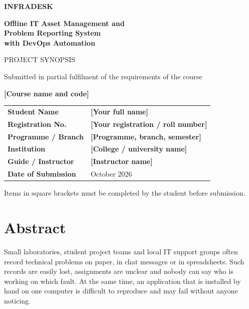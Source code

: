 \documentclass[12pt,a4paper]{article}
\newcommand{\fillin}[1]{\textbf{[#1]}}
\begin{document}
\begin{titlepage}
\centering
\vspace*{1.5cm}

{\Huge\bfseries\color{accent} INFRADESK\par}
\vspace{0.6cm}
{\Large\bfseries Offline IT Asset Management and\\ Problem Reporting System\\ with DevOps Automation\par}
\vspace{1.2cm}

{\large PROJECT SYNOPSIS\par}
\vspace{0.4cm}
{\normalsize Submitted in partial fulfilment of the requirements of the course\par}
{\normalsize \fillin{Course name and code}\par}

\vspace{2cm}

\begin{tabular}{>{\bfseries}l l}
Student Name        & \fillin{Your full name} \\[4pt]
Registration No.    & \fillin{Your registration / roll number} \\[4pt]
Programme / Branch  & \fillin{Programme, branch, semester} \\[4pt]
Institution         & \fillin{College / university name} \\[4pt]
Guide / Instructor  & \fillin{Instructor name} \\[4pt]
Date of Submission  & October 2026 \\
\end{tabular}

\vfill
{\small Items in square brackets must be completed by the student before submission.\par}
\end{titlepage}

\tableofcontents
\newpage

\section{Abstract}
Small laboratories, student project teams and local IT support groups often record technical problems on paper, in chat messages or in spreadsheets. Such records are easily lost, assignments are unclear and nobody can say who is working on which fault. At the same time, an application that is installed by hand on one computer is difficult to reproduce and may fail without anyone noticing.
\end{document}

